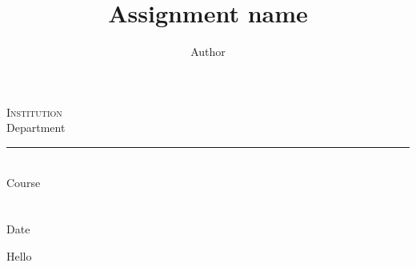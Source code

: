 \documentclass[letter,11pt]{article}
\title{Assignment name}
\author{Author}
\newcommand\theinstitution{Institution}
\newcommand\thedepartment{Department}
\newcommand\thecourse{Course}
\begin{document}
	\thispagestyle{empty}

	\begin{center}
		\textsc{\theinstitution}\\[2mm]
		
		\thedepartment
				
		\rule{0.6\textwidth}{0.5pt}\\[2mm]
		
		\thecourse \\[4mm]
		
		{\Large \textbf{\thetitle}}\\[2mm]
		
		\theauthor \\[2mm]
		
		{\small Date}
	\end{center}
	\medskip

	Hello
\end{document}
